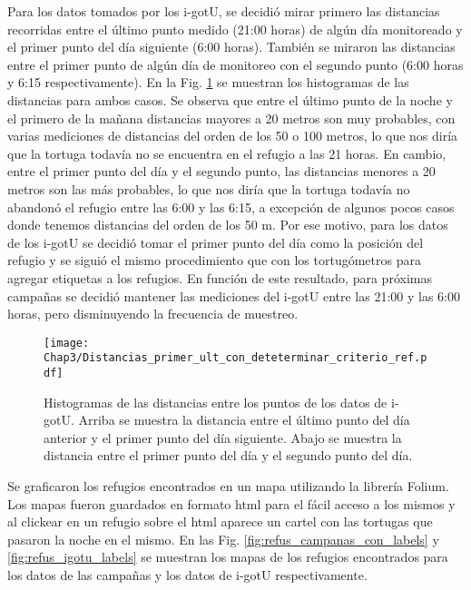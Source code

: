 Para los datos tomados por los i-gotU, se decidió mirar primero las distancias recorridas entre el último punto medido (21:00 horas) de algún día monitoreado y el primer punto del día siguiente (6:00 horas). También se miraron las distancias entre el primer punto de algún día de monitoreo con el segundo punto (6:00 horas y 6:15 respectivamente). En la Fig. \ref{fig:distancias} se muestran los histogramas de las distancias para ambos casos. Se observa que entre el último punto de la noche y el primero de la mañana distancias mayores a 20 metros son muy probables, con varias mediciones de distancias del orden de los 50 o 100 metros, lo que nos diría que la tortuga todavía no se encuentra en el refugio a las 21 horas. En cambio, entre el primer punto del día y el segundo punto, las distancias menores a 20 metros son las más probables, lo que nos diría que la tortuga todavía no abandonó el refugio entre las 6:00 y las 6:15, a excepción de algunos pocos casos donde tenemos distancias del orden de los 50 m. Por ese motivo, para los datos de los i-gotU se decidió tomar el primer punto del día como la posición del refugio y se siguió el mismo procedimiento que con los tortugómetros para agregar etiquetas a los refugios. En función de este resultado, para próximas campañas se decidió mantener las mediciones del i-gotU entre las 21:00 y las 6:00 horas, pero disminuyendo la frecuencia de muestreo.
 
 
\begin{figure}[ht]
    \begin{center}
        \texttt{[image: Chap3/Distancias\_primer\_ult\_con\_deteterminar\_criterio\_ref.pdf]}
        \caption[Histogramas de las distancias entre los puntos de los datos de i-gotU.]{ Histogramas de las distancias entre los puntos de los datos de i-gotU. Arriba se muestra la distancia entre el último punto del día anterior y el primer punto del día siguiente. Abajo se muestra la distancia entre el primer punto del día y el segundo punto del día.}
        \label{fig:distancias}
        \end{center}
\end{figure}
 
Se graficaron los refugios encontrados en un mapa utilizando la librería Folium. Los mapas fueron guardados en formato html para el fácil acceso a los mismos y al clickear en un refugio sobre el html aparece un cartel con las tortugas que pasaron la noche en el mismo. En las Fig. \ref{fig:refus_campanas_con_labels} y \ref{fig:refus_igotu_labels} se muestran los mapas de los refugios encontrados para los datos de las campañas y los datos de i-gotU respectivamente.
 
